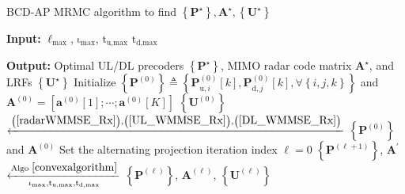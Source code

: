 \documentclass[9pt,journal]{IEEEtran}
\newcommand{\paren}[1]{\left({#1}\right)}
\newcommand{\bracket}[1]{{\left [{#1}\right ]}}
\newcommand{\braces}[1]{{\left\{ {#1}\right\}}}
\newcommand{\rr}{_\mathrm{r}}
\newcommand{\B}{\textrm{B}}
\newcommand{\rnr}{_{\mathrm{r},n_\mathrm{r}}}
\newcommand{\HrB}{\mathbf{H}_{\textrm{rB}}}
\newcommand{\Hrj}{\mathbf{H}_{\textrm{r},j}}
\newcommand{\HBj}{\mathbf{H}_{\textrm{B},j}}
\newcommand{\HiB}{\mathbf{H}_{i,\textrm{B}}}
\theoremstyle{definition}
\begin{document}
	\begin{algorithm}[ht!]
	    \caption{BCD-AP MRMC algorithm to find $\braces{\mathbf{P}^\star},\mathbf{A}^\star,\braces{\mathbf{U}^\star}$}
		\label{Alternating_sum}
		\begin{algorithmic}[1]
			\Statex \textbf{Input:} $\mathrm{\ell}_{\textrm{max}}$, $\mathrm{\iota}_{\textrm{max}}$, $\mathrm{t}_{\textrm{u,max}}$ $\mathrm{t}_{\textrm{d,max}}$
			
			\Statex \textbf{Output:} Optimal UL/DL precoders $\braces{\mathbf{P}^\star}$, MIMO radar code matrix $\mathbf{A}^\star$, and LRFs $\braces{\mathbf{U}^\star}$
			\State Initialize $\braces{\mathbf{P}^{\paren{\mathrm{0}}}}\triangleq
			\braces{\mathbf{P}^{\paren{\mathrm{0}}}_{\textrm{u},i}\bracket{k},\mathbf{P}^{\paren{\mathrm{0}}}_{\textrm{d},j}\bracket{k}, \forall \braces{i,j,k}}$ and $\mathbf{A}^{\paren{\mathrm{0}}}=\bracket{\mathbf{a}^{\paren{\mathrm{0}}}\bracket{1};\cdots;\mathbf{a}^{\paren{\mathrm{0}}}\bracket{\mathrm{\mathit{K}}}}$
			\State %
			$\braces{\mathbf{U}^{\paren{\mathrm{0}}}}$ $\xleftarrow{\mathrm{\paren{\ref{radarWMMSE_Rx}}},\mathrm{\paren{\ref{UL_WMMSE_Rx}}},\mathrm{\paren{\ref{DL_WMMSE_Rx}}}}$  $\braces{\mathbf{P}^{\paren{\mathrm{0}}}}$ and $\mathbf{A}^{\paren{\mathrm{0}}}$ 
			\State Set the alternating projection iteration index $\mathrm{\ell=0}$
			\Repeat \; 
			\State $\braces{\mathbf{P}^{\paren{\mathrm{\ell+1}}}}$, $\mathbf{A}^\prime$ $\xleftarrow[\mathrm{\iota}_{\textrm{max}},\mathrm{t}_{\textrm{u,max}},\mathrm{t}_{\textrm{d,max}}]{\textrm{Algo }\ref{convexalgorithm}}$ $\braces{\mathbf{P}^{\paren{\mathrm{\ell}}}}$, $\mathbf{A}^{\paren{\mathrm{\ell}}}$, $\braces{\mathbf{U}^{\paren{\mathrm{\ell}}}}$  %

\end{algorithmic}
\end{algorithm}
\end{document}
